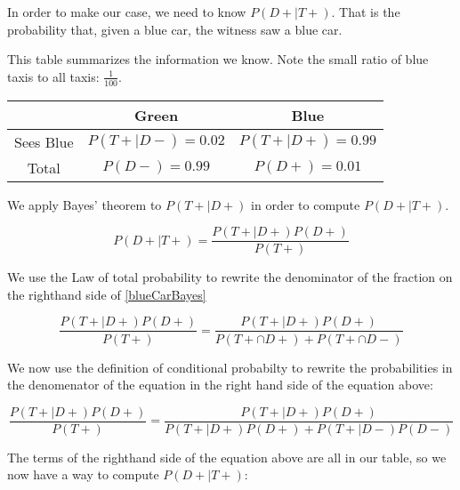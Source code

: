 \documentclass[a4paper,11pt]{article}
\begin{document}
In order to make our case, we need to know 
$P \left( D+ \mid T+ \right)$. That is the probability that, given a 
blue car, the witness saw a blue car.  

This table summarizes the information we know.  Note the small 
ratio of blue taxis to all taxis: $\frac{1}{100}$.

\begin{center}
  \begin{tabular}{ | c | c | c |  }
    \hline
         & Green & Blue     \\ \hline
    Sees Blue & $P\left(T+ \mid D- \right) = 0.02$ & $P \left( T+ \mid D+ \right)=0.99$   \\ \hline
    Total & $P \left( D- \right) = 0.99$ &  $P \left( D+ \right) = 0.01$   \\ \hline
  \end{tabular}
\end{center}

We apply Bayes' theorem \cite{reading3} to $P \left(T+ \mid D+ \right)$
in order to compute $P \left( D+ \mid T+ \right)$.

\begin{equation} \label{blueCarBayes}
P \left( D+ \mid T+ \right)
  = \frac{ P \left( T+ \mid D+ \right) P \left( D+ \right) }
    { P \left( T+ \right) }
\end{equation}

We use the Law of total probability to rewrite the denominator of the
fraction on the righthand side of \ref{blueCarBayes}

\begin{equation}
\frac{ P \left( T+ \mid D+ \right) P \left( D+ \right) }
    { P \left( T+ \right) }
  = 
\frac{ P \left( T+ \mid D+ \right) P \left( D+ \right) }
    { P \left( T+ \cap D+ \right) + P \left( T+ \cap D- \right) }
\end{equation}

We now use the definition of conditional probabilty to rewrite the
probabilities in the denomenator of the equation in the right hand side
of the equation above:

\begin{equation}
\frac{ P \left( T+ \mid D+ \right) P \left( D+ \right) }
    { P \left( T+ \right) }
  = 
\frac{ P \left( T+ \mid D+ \right) P \left( D+ \right) }
    { P \left( T+ \mid D+ \right) P \left( D+ \right) 
      + P \left( T+ \mid D- \right) P \left(D- \right)}
\end{equation}

The terms of the righthand side of the equation above are all in our
table, so we now have a way to compute $P \left( D+ \mid T+ \right)$:
\end{document}
